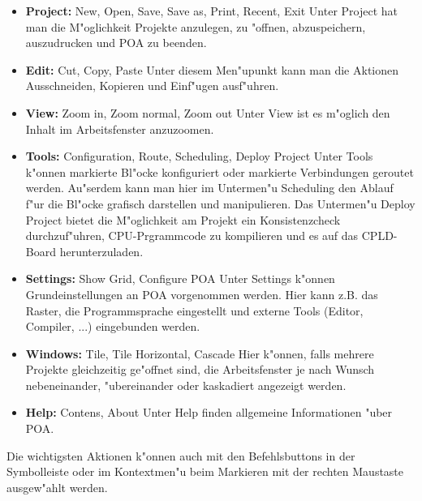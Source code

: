 \documentclass[a4paper,titlepage,12pt,ngerman]{scrbook}
\begin{document}
\begin{itemize}
\item {\bf Project:}	New, Open, Save, Save as, Print, Recent, Exit\newline
Unter Project hat man die M"oglichkeit Projekte anzulegen, zu "offnen, abzuspeichern, auszudrucken und POA zu beenden.
\item {\bf Edit:}	Cut, Copy, Paste\newline
Unter diesem Men"upunkt kann man die Aktionen Ausschneiden, Kopieren und Einf"ugen ausf"uhren.
\item {\bf View:}	Zoom in, Zoom normal, Zoom out\newline
Unter View ist es m"oglich den Inhalt im Arbeitsfenster anzuzoomen.
\item {\bf Tools:} 	Configuration, Route, Scheduling, Deploy Project\newline
Unter Tools k"onnen markierte Bl"ocke konfiguriert oder markierte Verbindungen geroutet werden. Au"serdem kann man hier im Untermen"u Scheduling den Ablauf f"ur die Bl"ocke grafisch darstellen und manipulieren. Das Untermen"u Deploy Project bietet die M"oglichkeit am Projekt ein Konsistenzcheck durchzuf"uhren, CPU-Prgrammcode zu kompilieren und es auf das CPLD-Board herunterzuladen.
\item {\bf Settings:}	Show Grid, Configure POA\newline
Unter Settings k"onnen Grundeinstellungen an POA vorgenommen werden. Hier kann z.B. das Raster, die Programmsprache eingestellt und externe Tools (Editor, Compiler, ...) eingebunden werden.
\item {\bf Windows:} 	Tile, Tile Horizontal, Cascade\newline
Hier k"onnen, falls mehrere Projekte gleichzeitig ge"offnet sind, die Arbeitsfenster je nach Wunsch nebeneinander, "ubereinander oder kaskadiert angezeigt werden.
\item {\bf Help:} 	Contens, About\newline
Unter Help finden allgemeine Informationen "uber POA.\par
\end{itemize}

Die wichtigsten Aktionen k"onnen auch mit den Befehlsbuttons in der Symbolleiste oder im Kontextmen"u beim Markieren mit der rechten Maustaste ausgew"ahlt werden.
\end{document}
